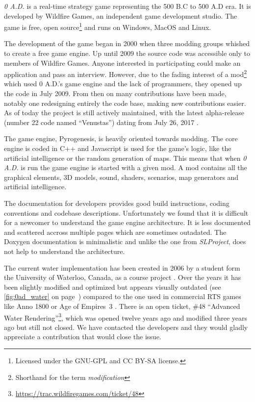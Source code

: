 \textit{0 A.D.} is a real-time strategy game representing the 500 B.C to 500 A.D
era. It is developed by Wildfire Games, an independent game development studio.
The game is free, open source\footnote{Licensed under the GNU-GPL and CC BY-SA
license.} and runs on Windows, MacOS and Linux.

The development of the game began in 2000 when three modding groups whished to
create a free game engine. Up until 2009 the source code was accessible only to
members of Wildfire Games. Anyone interested in participating could make an
application and pass an interview. However, due to the fading interest of a
mod\footnote{Shorthand for the term \textit{modification}} which used 0 A.D.'s
game engine and the lack of programmers, they opened up the code in July 2009.
From then on many contributions have been made, notably one redesigning entirely
the code base, making new contributions easier. As of today the project is still
actively maintained, with the latest alpha-release (number 22 code named
``Venustas'') dating from July 26,
2017 \autocite{wildfire0adproject,wildfire0adstory}.

The game engine, Pyrogenesis, is heavily oriented towards modding. The core
engine is coded in C++ and Javascript is used for the game's logic, like the
artificial intelligence or the random generation of maps. This means that when
\textit{0 A.D.} is run the game engine is started with a given mod. A mod
contains all the graphical elements, 3D models, sound, shaders, scenarios, map
generators and artificial intelligence.

The documentation for developers provides good build instructions, coding
conventions and codebase descriptions. Unfortunately we found that it is
difficult for a newcomer to understand the game engine architecture. It is less
documented and scattered accross multiple pages which are sometimes outadated.
The Doxygen documentation is minimalistic and unlike the one from
\textit{SLProject}, does not help to understand the architecture.

The current water implementation has been created in 2006 by a student form the
University of Waterloo, Canada, as a course project \autocite{zaharia2006cs}.
Over the years it has been slightly modified and optimized but appears visually
outdated (see \autoref{fig:0ad_water} on page~\pageref{fig:0ad_water}) compared
to the one used in commercial RTS games like Anno 1800 or Age of Empires~3
. There is an open ticket, \#48
``Advanced Water
Rendering''\footnote{\url{https://trac.wildfiregames.com/ticket/48}}, which was
opened twelve years ago and modified three years ago but still not closed.  We
have contacted the developers and they would gladly appreciate a contribution
that would close the issue.

